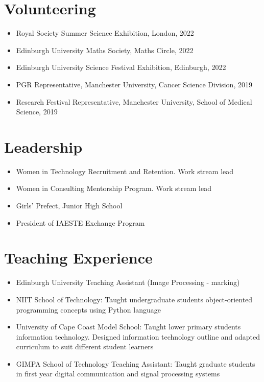 \documentclass[11pt,a4paper]{article}
\begin{document}
\section*{Volunteering}
\begin{itemize}[leftmargin=*,nosep]
    \item Royal Society Summer Science Exhibition, London, 2022
    \item Edinburgh University Maths Society, Maths Circle, 2022
    \item Edinburgh University Science Festival Exhibition, Edinburgh, 2022
    \item PGR Representative, Manchester University, Cancer Science Division, 2019
    \item Research Festival Representative, Manchester University, School of Medical Science, 2019
\end{itemize}

\section*{Leadership}
\begin{itemize}[leftmargin=*,nosep]
    \item Women in Technology Recruitment and Retention. Work stream lead
    \item Women in Consulting Mentorship Program. Work stream lead
    \item Girls' Prefect, Junior High School
    \item President of IAESTE Exchange Program
\end{itemize}

\section*{Teaching Experience}
\begin{itemize}[leftmargin=*,nosep]
    \item Edinburgh University Teaching Assistant (Image Processing - marking)
    \item NIIT School of Technology: Taught undergraduate students object-oriented programming concepts using Python language
    \item University of Cape Coast Model School: Taught lower primary students information technology. Designed information technology outline and adapted curriculum to suit different student learners
    \item GIMPA School of Technology Teaching Assistant: Taught graduate students in first year digital communication and signal processing systems
\end{itemize}
\end{document}
